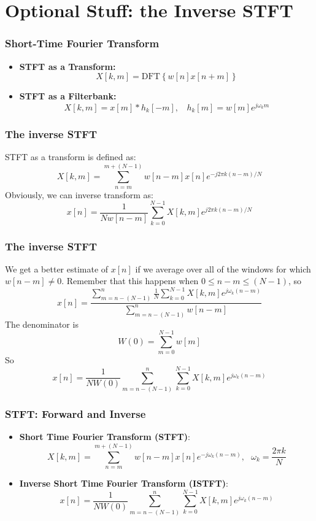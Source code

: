 \documentclass{beamer}
\begin{document}
\section[Inverse]{Optional Stuff: the Inverse STFT}
\setcounter{subsection}{1}

\begin{frame}
  \frametitle{Short-Time Fourier Transform}
  \begin{itemize}
  \item {\bf STFT as a Transform:}
    \[
    X[k,m] = \mbox{DFT}\left\{w[n]x[n+m]\right\}
    \]
  \item {\bf STFT as a Filterbank:}
    \[
    X[k,m] = x[m] \ast h_k[-m],~~~~h_k[m] = w[m]e^{j\omega_k m}
    \]
  \end{itemize}
\end{frame}

\begin{frame}
  \frametitle{The inverse STFT}
  STFT as a transform is defined as:
  \[
  X[k,m]= \sum_{n=m}^{m+(N-1)} w[n-m]x[n]e^{-j2\pi k(n-m)/N}
  \]
  Obviously, we can inverse transform as:
  \[
  x[n] = \frac{1}{N w[n-m]}\sum_{k=0}^{N-1} X[k,m]e^{j2\pi k(n-m)/N}
  \]
\end{frame}
\begin{frame}
  \frametitle{The inverse STFT}

  We get a better estimate of $x[n]$ if we average over all of the
  windows for which $w[n-m]\ne 0$.  Remember that this
  happens when $0\le n-m\le (N-1)$, so
  \[
  x[n] = \frac{\sum_{m=n-(N-1)}^{n}\frac{1}{N}\sum_{k=0}^{N-1} X[k,m]e^{j\omega_k (n-m)}}{\sum_{m=n-(N-1)}^{n}w[n-m]}
  \]
  The denominator is
  \[
  W(0)=\sum_{m=0}^{N-1} w[m]
  \]
  So
  \[
  x[n] = \frac{1}{NW(0)}\sum_{m=n-(N-1)}^{n}\sum_{k=0}^{N-1} X[k,m]e^{j\omega_k (n-m)}
  \]
\end{frame}

\begin{frame}
  \frametitle{STFT: Forward and Inverse}
  \begin{itemize}
  \item {\bf Short Time Fourier Transform (STFT)}:
    \[
    X[k,m]= \sum_{n=m}^{m+(N-1)} w[n-m]x[n]e^{-j\omega_k (n-m)},~~~\omega_k=\frac{2\pi k}{N}
    \]
  \item {\bf Inverse Short Time Fourier Transform (ISTFT)}:
    \[
    x[n] = \frac{1}{NW(0)}\sum_{m=n-(N-1)}^{n}\sum_{k=0}^{N-1} X[k,m]e^{j\omega_k (n-m)}
    \]
  \end{itemize}
\end{frame}
\end{document}
